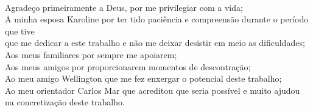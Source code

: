 \begin{description}
	\item {}\\[1.5cm]
	\raggedright{Agradeço primeiramente a Deus, por me privilegiar com a vida; \\[5pt]
	A minha esposa Karoline por ter tido paciência e compreensão durante o período que tive\\[5pt] que me dedicar a este trabalho e não me deixar desistir em meio as dificuldades;\\[5pt]
	Aos meus familiares por sempre me apoiarem;\\[5pt]
	Aos meus amigos por proporcionarem momentos de descontração;\\[5pt]
	Ao meu amigo Wellington que me fez enxergar o potencial deste trabalho;\\[5pt]
	Ao meu orientador Carlos Mar que acreditou que seria possível e muito ajudou\\[5pt] na concretização deste trabalho.}
\end{description}
